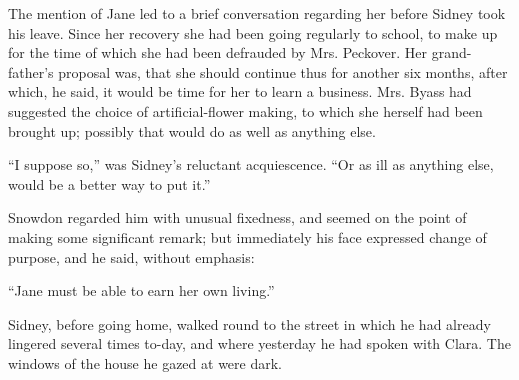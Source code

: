 The mention of Jane led to a brief conversation regarding her before
Sidney took his leave. Since her recovery she had been going regularly
to school, to make up for the time of which she had been defrauded by
Mrs. Peckover. Her grand-father's proposal was, that she should continue
thus for another six months, after which, he said, it would be time for
her to learn a business. Mrs. Byass had suggested the choice of
artificial-flower making, to which she herself had been brought up;
possibly that would do as well as anything else.

{\protect\hypertarget{251}{}{}}``I suppose so,'' was Sidney's reluctant
acquiescence. ``Or as ill as anything else, would be a better way to put
it.''

Snowdon regarded him with unusual fixedness, and seemed on the point of
making some significant remark; but immediately his face expressed
change of purpose, and he said, without emphasis:

``Jane must be able to earn her own living.''

Sidney, before going home, walked round to the street in which he had
already lingered several times to-day, and where yesterday he had spoken
with Clara. The windows of the house he gazed at were dark.
